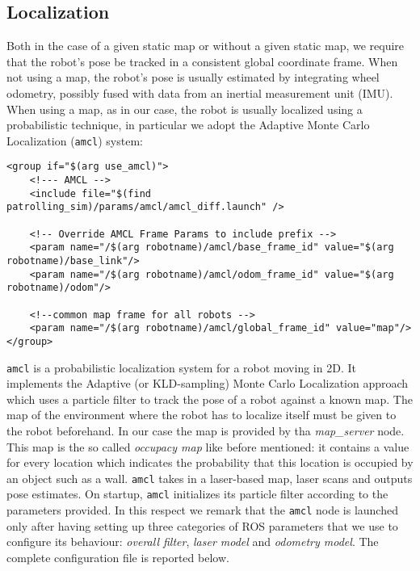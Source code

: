 \subsection{Localization}
Both in the case of a given static map or without a given static map, we
require that the robot’s pose be tracked in a consistent global coordinate frame.
When not using a map, the robot’s pose is usually estimated by integrating
wheel odometry, possibly fused with data from an inertial measurement unit
(IMU). When using a map, as in our case, the robot is usually localized using
a probabilistic technique, in particular we adopt the Adaptive Monte Carlo
Localization (\texttt{amcl}) system:
\begin{lstlisting}
<group if="$(arg use_amcl)">
    <!--- AMCL -->
    <include file="$(find patrolling_sim)/params/amcl/amcl_diff.launch" />       
            
    <!-- Override AMCL Frame Params to include prefix -->
    <param name="/$(arg robotname)/amcl/base_frame_id" value="$(arg robotname)/base_link"/>
    <param name="/$(arg robotname)/amcl/odom_frame_id" value="$(arg robotname)/odom"/>
    
    <!--common map frame for all robots -->
    <param name="/$(arg robotname)/amcl/global_frame_id" value="map"/> 
</group>
\end{lstlisting}
\texttt{amcl} is a probabilistic localization system for a robot moving in 2D.
It implements the Adaptive (or KLD-sampling) Monte Carlo Localization
approach which uses a particle filter to track the pose of a robot against
a known map. The map of the environment where the robot has to localize
itself must be given to the robot beforehand. In our case the map is provided
by tha \textit{map\_server} node. This map is the so called \textit{occupacy map}
like before mentioned: it contains a value for every location which indicates the 
probability that this location is occupied by an object such as a wall. 
\texttt{amcl} takes in a laser-based map, laser scans and outputs pose estimates.
On startup, \texttt{amcl} initializes its particle filter according to the parameters
provided. In this respect we remark that the \texttt{amcl} node is launched only 
after having setting up three categories of ROS parameters that we use to configure 
its behaviour: \textit{overall filter}, \textit{laser model} and \textit{odometry model}.
The complete configuration file is reported below.
